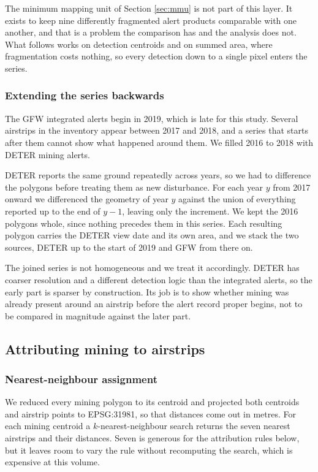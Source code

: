 \documentclass[11pt]{article}
\begin{document}
The minimum mapping unit of Section \ref{sec:mmu} is not part of this layer. It exists to keep nine differently fragmented alert products comparable with one another, and that is a problem the comparison has and the analysis does not. What follows works on detection centroids and on summed area, where fragmentation costs nothing, so every detection down to a single pixel enters the series.

\subsubsection{Extending the series backwards}

The GFW integrated alerts begin in 2019, which is late for this study. Several airstrips in the inventory appear between 2017 and 2018, and a series that starts after them cannot show what happened around them. We filled 2016 to 2018 with DETER mining alerts.

DETER reports the same ground repeatedly across years, so we had to difference the polygons before treating them as new disturbance. For each year $y$ from 2017 onward we differenced the geometry of year $y$ against the union of everything reported up to the end of $y-1$, leaving only the increment. We kept the 2016 polygons whole, since nothing precedes them in this series. Each resulting polygon carries the DETER view date and its own area, and we stack the two sources, DETER up to the start of 2019 and GFW from there on.

The joined series is not homogeneous and we treat it accordingly. DETER has coarser resolution and a different detection logic than the integrated alerts, so the early part is sparser by construction. Its job is to show whether mining was already present around an airstrip before the alert record proper begins, not to be compared in magnitude against the later part.

\subsection{Attributing mining to airstrips}

\subsubsection{Nearest-neighbour assignment}

We reduced every mining polygon to its centroid and projected both centroids and airstrip points to EPSG:31981, so that distances come out in metres. For each mining centroid a $k$-nearest-neighbour search returns the seven nearest airstrips and their distances. Seven is generous for the attribution rules below, but it leaves room to vary the rule without recomputing the search, which is expensive at this volume.
\end{document}
